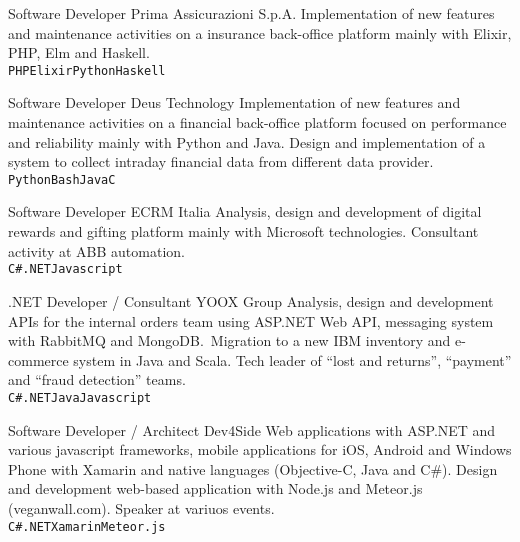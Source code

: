 \documentclass[9pt]{developercv}
\begin{document}
\begin{entrylist}
        {Software Developer}
        {Prima Assicurazioni S.p.A.}
        {Implementation of new features and maintenance activities on a insurance back-office platform mainly with Elixir, PHP, Elm and Haskell. \\
       \texttt{PHP}\slashsep\texttt{Elixir}\slashsep\texttt{Python}\slashsep\texttt{Haskell}}

        {Software Developer}
        {Deus Technology}
        {Implementation of new features and maintenance activities on a financial back-office platform focused on performance and reliability mainly with Python and Java. Design and implementation of a system to collect intraday financial data from different data provider. \\
       \texttt{Python}\slashsep\texttt{Bash}\slashsep\texttt{Java}\slashsep\texttt{C}}

        {Software Developer}
        {ECRM Italia}
        {Analysis, design and development of digital rewards and gifting platform mainly with Microsoft technologies. Consultant activity at ABB automation. \\
       \texttt{C\#}\slashsep\texttt{.NET}\slashsep\texttt{Javascript}}

        {.NET Developer / Consultant}
        {YOOX Group}
        {Analysis, design and development APIs for the internal orders team using ASP.NET Web API, messaging system with RabbitMQ and MongoDB.\ Migration to a new IBM inventory and e-commerce system in Java and Scala. Tech leader of “lost and returns”, “payment” and “fraud detection” teams. \\
       \texttt{C\#}\slashsep\texttt{.NET}\slashsep\texttt{Java}\slashsep\texttt{Javascript}}

        {Software Developer / Architect}
        {Dev4Side}
        {Web applications with ASP.NET and various javascript frameworks, mobile applications for iOS, Android and Windows Phone with Xamarin and native languages (Objective-C, Java and C\#). Design and development web-based application with Node.js and Meteor.js (veganwall.com). Speaker at variuos events. \\
       \texttt{C\#}\slashsep\texttt{.NET}\slashsep\texttt{Xamarin}\slashsep\texttt{Meteor.js}}


\end{entrylist}
\end{document}
